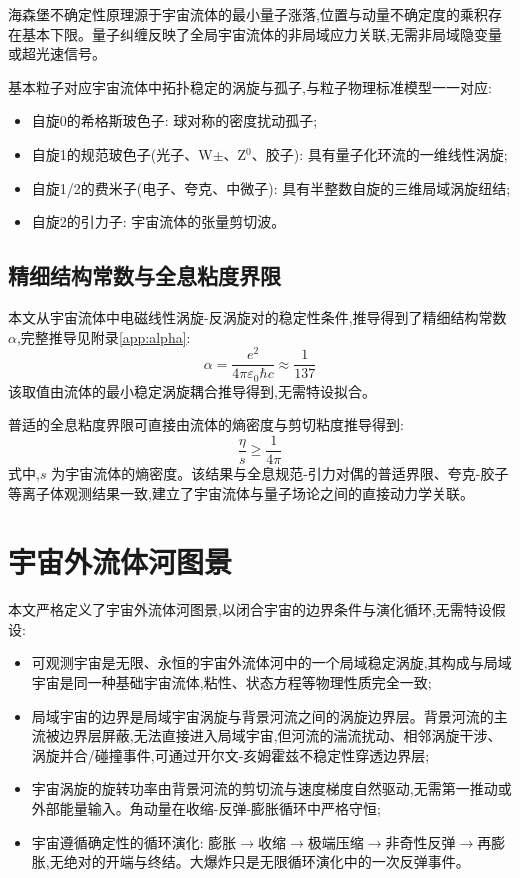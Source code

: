 \documentclass[11pt,a4paper]{article}
\begin{document}
海森堡不确定性原理源于宇宙流体的最小量子涨落,位置与动量不确定度的乘积存在基本下限。量子纠缠反映了全局宇宙流体的非局域应力关联,无需非局域隐变量或超光速信号。

基本粒子对应宇宙流体中拓扑稳定的涡旋与孤子,与粒子物理标准模型一一对应:
\begin{itemize}
\item 自旋0的希格斯玻色子: 球对称的密度扰动孤子;
\item 自旋1的规范玻色子(光子、W$\pm$、Z$^0$、胶子): 具有量子化环流的一维线性涡旋;
\item 自旋1/2的费米子(电子、夸克、中微子): 具有半整数自旋的三维局域涡旋纽结;
\item 自旋2的引力子: 宇宙流体的张量剪切波。
\end{itemize}

\subsection{精细结构常数与全息粘度界限}
\label{sec:alpha_eta}
本文从宇宙流体中电磁线性涡旋-反涡旋对的稳定性条件,推导得到了精细结构常数 $\alpha$,完整推导见附录\ref{app:alpha}:
\begin{equation}
\alpha = \frac{e^2}{4\pi\varepsilon_0 \hbar c} \approx \frac{1}{137}
\end{equation}
该取值由流体的最小稳定涡旋耦合推导得到,无需特设拟合。

普适的全息粘度界限可直接由流体的熵密度与剪切粘度推导得到:
\begin{equation}
\frac{\eta}{s} \geq \frac{1}{4\pi}
\end{equation}
式中,$s$ 为宇宙流体的熵密度。该结果与全息规范-引力对偶的普适界限、夸克-胶子等离子体观测结果一致,建立了宇宙流体与量子场论之间的直接动力学关联。

\section{宇宙外流体河图景}
\label{sec:outer_river}
本文严格定义了宇宙外流体河图景,以闭合宇宙的边界条件与演化循环,无需特设假设:
\begin{itemize}
\item 可观测宇宙是无限、永恒的宇宙外流体河中的一个局域稳定涡旋,其构成与局域宇宙是同一种基础宇宙流体,粘性、状态方程等物理性质完全一致;
\item 局域宇宙的边界是局域宇宙涡旋与背景河流之间的涡旋边界层。背景河流的主流被边界层屏蔽,无法直接进入局域宇宙,但河流的湍流扰动、相邻涡旋干涉、涡旋并合/碰撞事件,可通过开尔文-亥姆霍兹不稳定性穿透边界层;
\item 宇宙涡旋的旋转功率由背景河流的剪切流与速度梯度自然驱动,无需第一推动或外部能量输入。角动量在收缩-反弹-膨胀循环中严格守恒;
\item 宇宙遵循确定性的循环演化: 膨胀$\to$收缩$\to$极端压缩$\to$非奇性反弹$\to$再膨胀,无绝对的开端与终结。大爆炸只是无限循环演化中的一次反弹事件。
\end{itemize}
\end{document}
